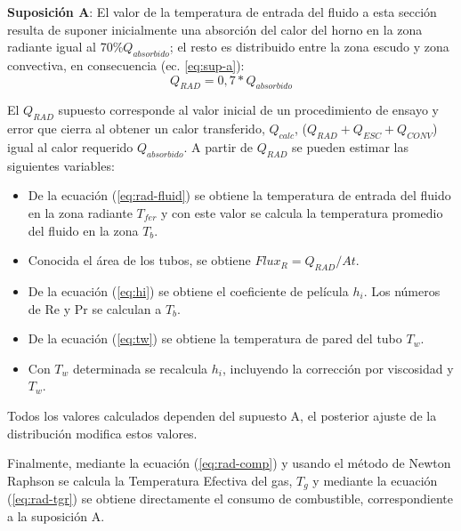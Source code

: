 \par \textbf{Suposición A}: El valor de la temperatura de entrada del fluido a esta sección resulta de suponer inicialmente una absorción del calor del horno en la zona radiante igual al 70\%$Q_{absorbido}$; el resto es distribuido entre la zona escudo y zona convectiva, en consecuencia (ec. \ref{eq:sup-a}):
\begin{equation}\label{eq:sup-a} Q_{RAD} = 0,7 * Q_{absorbido} \end{equation}
\par El $Q_{RAD}$ supuesto corresponde al valor inicial de un procedimiento de ensayo y error que cierra al obtener un calor transferido, $Q_{calc}$, ($Q_{RAD} + Q_{ESC} + Q_{CONV}$) igual al calor requerido $Q_{absorbido}$. A partir de $Q_{RAD}$ se pueden estimar las siguientes variables:
\begin{itemize}
    \item De la ecuación (\ref{eq:rad-fluid}) se obtiene la temperatura de entrada del fluido en la zona radiante $T_{fer}$ y con este valor se calcula la temperatura promedio del fluido en la zona $T_b$.
    \item Conocida el área de los tubos, se obtiene $Flux_R = Q_{RAD} /At$.
    \item De la ecuación (\ref{eq:hi}) se obtiene el coeficiente de película $h_i$. Los números de Re y Pr se calculan a $T_b$.
    \item De la ecuación (\ref{eq:tw}) se obtiene la temperatura de pared del tubo $T_w$.
    \item Con $T_w$ determinada se recalcula $h_i$, incluyendo la corrección por viscosidad y $T_w$.
\end{itemize}
\par Todos los valores calculados dependen del supuesto A, el posterior ajuste de la distribución modifica estos valores.
\par Finalmente, mediante la ecuación (\ref{eq:rad-comp}) y usando el método de Newton Raphson se calcula la Temperatura Efectiva del gas, $T_g$ y mediante la ecuación (\ref{eq:rad-tgr}) se obtiene directamente el consumo de combustible, correspondiente a la suposición A.

